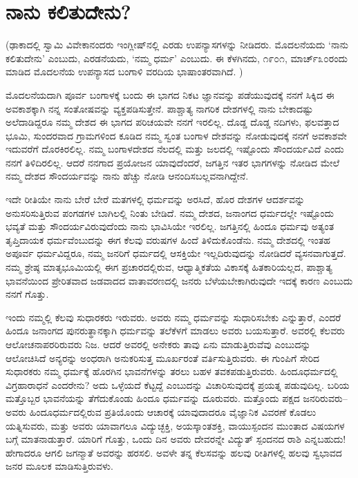 
\chapter{ನಾನು ಕಲಿತುದೇನು?}

(ಢಾಕಾದಲ್ಲಿ ಸ್ವಾಮಿ ವಿವೇಕಾನಂದರು ಇಂಗ್ಲೀಷ್​ನಲ್ಲಿ ಎರಡು ಉಪನ್ಯಾಸಗಳನ್ನು ನೀಡಿದರು. ಮೊದಲನೆಯದು ‘ನಾನು ಕಲಿತುದೇನು’ ಎಂಬುದು, ಎರಡನೆಯದು, ‘ನಮ್ಮ ಧರ್ಮ’ ಎಂಬುದು. ಈ ಕೆಳಗಿನದು, ೧೯೦೧, ಮಾರ್ಚ್​ ೩೦ರಂದು ಮಾಡಿದ ಮೊದಲನೆಯ ಉಪನ್ಯಾಸದ ಬಂಗಾಳಿ ವರದಿಯ ಭಾಷಾಂತರವಾಗಿದೆ. )

ಮೊದಲನೆಯದಾಗಿ ಪೂರ್ವ ಬಂಗಾಳಕ್ಕೆ ಬಂದು ಈ ಭಾಗದ ನಿಕಟ ಜ್ಞಾನವನ್ನು ಪಡೆಯುವುದಕ್ಕೆ ನನಗೆ ಸಿಕ್ಕಿದ ಈ ಅವಕಾಶಕ್ಕಾಗಿ ನನ್ನ ಸಂತೋಷವನ್ನು ವ್ಯಕ್ತಪಡಿಸುತ್ತೇನೆ. ಪಾಶ್ಚಾತ್ಯ ನಾಗರಿಕ ದೇಶಗಳಲ್ಲಿ ನಾನು ಬೇಕಾದಷ್ಟು ಅಲೆದಾಡಿದ್ದರೂ ನಮ್ಮ ದೇಶದ ಈ ಭಾಗದ ಪರಿಚಯವೇ ನನಗೆ ಇರಲಿಲ್ಲ. ದೊಡ್ಡ ದೊಡ್ಡ ನದಿಗಳು, ಫಲವತ್ತಾದ ಭೂಮಿ, ಸುಂದರವಾದ ಗ್ರಾಮಗಳಿಂದ ಕೂಡಿದ ನಮ್ಮ ಸ್ವಂತ ಬಂಗಾಳ ದೇಶವನ್ನು ನೋಡುವುದಕ್ಕೆ ನನಗೆ ಅವಕಾಶವೇ ಇದುವರೆಗೆ ದೊರಕಿರಲಿಲ್ಲ. ನಮ್ಮ ಬಂಗಾಳದೇಶದ ನೆಲದಲ್ಲಿ ಮತ್ತು ಜಲದಲ್ಲಿ ಇಷ್ಟೊಂದು ಸೌಂದರ್ಯವಿದೆ ಎಂದು ನನಗೆ ತಿಳಿದಿರಲಿಲ್ಲ. ಆದರೆ ನನಗಾದ ಪ್ರಯೋಜನ ಯಾವುದೆಂದರೆ, ಜಗತ್ತಿನ ಇತರ ಭಾಗಗಳನ್ನು ನೋಡಿದ ಮೇಲೆ ನಮ್ಮ ದೇಶದ ಸೌಂದರ್ಯವನ್ನು ನಾನು ಹೆಚ್ಚು ನೋಡಿ ಆನಂದಿಸಬಲ್ಲವನಾಗಿದ್ದೇನೆ. 

ಇದೇ ರೀತಿಯೇ ನಾನು ಬೇರೆ ಬೇರೆ ಮತಗಳಲ್ಲಿ ಧರ್ಮವನ್ನು ಅರಸಿದೆ, ಹೊರ ದೇಶಗಳ ಆದರ್ಶವನ್ನು ಅನುಸರಿಸುತ್ತಿರುವ ಪಂಗಡಗಳ ಬಾಗಿಲಲ್ಲಿ ನಿಂತು ಬೇಡಿದೆ. ನಮ್ಮ ದೇಶದ, ಜನಾಂಗದ ಧರ್ಮದಲ್ಲೇ ಇಷ್ಟೊಂದು ಭವ್ಯತೆ ಮತ್ತು ಸೌಂದರ್ಯವಿರುವುದೆಂದು ನಾನು ಭಾವಿಸಿಯೇ ಇರಲಿಲ್ಲ. ಜಗತ್ತಿನಲ್ಲಿ ಹಿಂದೂ ಧರ್ಮವು ಅತ್ಯಂತ ತೃಪ್ತಿದಾಯಕ ಧರ್ಮವೆಂಬುದನ್ನು ಈಗ ಕೆಲವು ವರುಷಗಳ ಹಿಂದೆ ತಿಳಿದುಕೊಂಡೆನು. ನಮ್ಮ ದೇಶದಲ್ಲಿ ಇಂತಹ ಅಪೂರ್ವ ಧರ್ಮವಿದ್ದರೂ, ನಮ್ಮ ಜನರಿಗೆ ಧರ್ಮದಲ್ಲಿ ಆಸಕ್ತಿಯೇ ಇಲ್ಲದಿರುವುದನ್ನು ನೋಡಿದರೆ ವ್ಯಸನವಾಗುತ್ತದೆ. ನಮ್ಮ ಶ್ರೇಷ್ಠ ಮಾತೃಭೂಮಿಯಲ್ಲಿ ಈಗ ಪ್ರಚಾರದಲ್ಲಿರುವ, ಆಧ್ಯಾತ್ಮಿಕತೆಯ ವಿಕಾಸಕ್ಕೆ ಹಿತಕಾರಿಯಲ್ಲದ, ಪಾಶ್ಚಾತ್ಯ ಭಾವನೆಯಿಂದ ಪ್ರೇರಿತವಾದ ಜಡವಾದದ ವಾತಾವರಣದಲ್ಲಿ ಜನರು ಬೆಳೆಯಬೇಕಾಗಿರುವುದೇ ಇದಕ್ಕೆ ಕಾರಣ ಎಂಬುದು ನನಗೆ ಗೊತ್ತು. 

ಇಂದು ನಮ್ಮಲ್ಲಿ ಕೆಲವು ಸುಧಾರಕರು ಇರುವರು. ಅವರು ನಮ್ಮ ಧರ್ಮವನ್ನು ಸುಧಾರಿಸಬೇಕು ಎನ್ನುತ್ತಾರೆ, ಎಂದರೆ ಹಿಂದೂ ಜನಾಂಗದ ಪುನರುತ್ಥಾನಕ್ಕಾಗಿ ಧರ್ಮವನ್ನು ತಲೆಕೆಳಗೆ ಮಾಡಲು ಅವರು ಬಯಸುತ್ತಾರೆ. ಅವರಲ್ಲಿ ಕೆಲವರು ಆಲೋಚನಾಪರರಿರುವರು ನಿಜ. ಆದರೆ ಅವರಲ್ಲಿ ಅನೇಕರು ತಾವು ಏನು ಮಾಡುತ್ತಿರುವೆವು ಎಂಬುದನ್ನು ಆಲೋಚಿಸಿದೆ ಅನ್ಯರನ್ನು ಅಂಧರಾಗಿ ಅನುಕರಿಸುತ್ತ ಮೂರ್ಖರಂತೆ ವರ್ತಿಸುತ್ತಿರುವರು. ಈ ಗುಂಪಿಗೆ ಸೇರಿದ ಸುಧಾರಕರು ನಮ್ಮ ಧರ್ಮಕ್ಕೆ ಹೊರಗಿನ ಭಾವನೆಗಳನ್ನು ತರಲು ಬಹಳ ತವಕಪಡುತ್ತಿರುವರು. ಹಿಂದೂಧರ್ಮದಲ್ಲಿ ವಿಗ್ರಹಾರಾಧನೆ ಎಂದರೇನು? ಅದು ಒಳ್ಳೆಯದೆ ಕೆಟ್ಟದ್ದೆ ಎಂಬುದನ್ನು ವಿಚಾರಿಸುವುದಕ್ಕೆ ಪ್ರಯತ್ನ ಪಡುವುದಿಲ್ಲ. ಬರಿಯ ಮತ್ತೊಬ್ಬರ ಭಾವನೆಯನ್ನು ತೆಗೆದುಕೊಂಡು ಹಿಂದೂ ಧರ್ಮವನ್ನು ದೂರುವರು. ಮತ್ತೊಂದು ಪಕ್ಷದ ಜನರಿರುವರು–ಅವರು ಹಿಂದೂಧರ್ಮದಲ್ಲಿರುವ ಪ್ರತಿಯೊಂದು ಆಚಾರಕ್ಕೆ ಯಾವುದಾದರೂ ವೈಜ್ಞಾನಿಕ ವಿವರಣೆ ಕೊಡಲು ಯತ್ನಿಸುವರು, ಮತ್ತು ಅವರು ಯಾವಾಗಲೂ ವಿದ್ಯುಚ್ಛಕ್ತಿ, ಅಯಸ್ಕಾಂತಶಕ್ತಿ, ವಾಯುಸ್ಪಂದನ ಮುಂತಾದ ವಿಷಯಗಳ ಬಗ್ಗೆ ಮಾತನಾಡುತ್ತಾರೆ. ಯಾರಿಗೆ ಗೊತ್ತು, ಒಂದು ದಿನ ಅವರು ದೇವರನ್ನೇ ವಿದ್ಯುತ್​ ಸ್ಪಂದನದ ರಾಶಿ ಎನ್ನಬಹುದು! ಹೇಗಾದರೂ ಆಗಲಿ ಜಗನ್ಮಾತೆ ಅವರನ್ನು ಹರಸಲಿ. ಅವಳೇ ತನ್ನ ಕೆಲಸವನ್ನು ಹಲವು ರೀತಿಗಳಲ್ಲಿ ಹಲವು ಸ್ವಭಾವದ ಜನರ ಮೂಲಕ ಮಾಡಿಸುತ್ತಿರುವಳು. 


